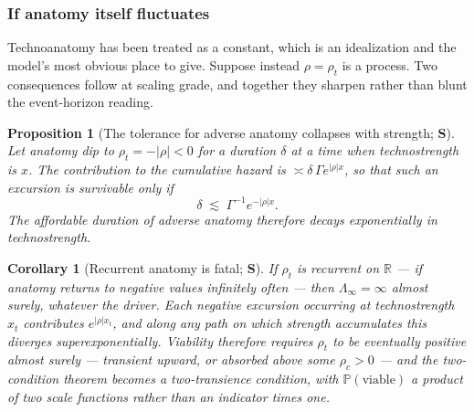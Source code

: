 \documentclass[11pt]{article}
\numberwithin{equation}{section}
\theoremstyle{plain}
\newtheorem{proposition}[theorem]{Proposition}
\newtheorem{corollary}[theorem]{Corollary}
\theoremstyle{definition}
\theoremstyle{remark}
\newcommand{\PP}{\mathbb{P}}
\newcommand{\R}{\mathbb{R}}
\begin{document}
\subsubsection{If anatomy itself fluctuates}\label{gr1:subsub:fluct}

Technoanatomy has been treated as a constant, which is an idealization
and the model's most obvious place to give. Suppose instead
$\rho=\rho_t$ is a process. Two consequences follow at scaling grade,
and together they sharpen rather than blunt the event-horizon reading.

\begin{proposition}[The tolerance for adverse anatomy collapses with
strength; \textbf{S}]\label{gr1:prop:tolerance}
Let anatomy dip to $\rho_t=-|\rho|<0$ for a duration $\delta$ at a time
when technostrength is $x$. The contribution to the cumulative hazard
is $\asymp\delta\,\Gamma e^{|\rho|x}$, so that such an excursion is
survivable only if
\begin{equation}\label{gr1:eq:tolerance}
\delta\;\lesssim\;\Gamma^{-1}e^{-|\rho|x}.
\end{equation}
The affordable duration of adverse anatomy therefore decays
\emph{exponentially in technostrength}.
\end{proposition}

\begin{corollary}[Recurrent anatomy is fatal; \textbf{S}]
\label{gr1:cor:recurrentanatomy}
If $\rho_t$ is recurrent on $\R$ --- if anatomy returns to negative
values infinitely often --- then $\Lambda_\infty=\infty$ almost surely,
\emph{whatever the driver}. Each negative excursion occurring at
technostrength $x_t$ contributes $e^{|\rho|x_t}$, and along any path on
which strength accumulates this diverges superexponentially. Viability
therefore requires $\rho_t$ to be eventually positive almost surely ---
transient upward, or absorbed above some $\rho_c>0$ --- and the
two-condition theorem becomes a \emph{two-transience} condition, with
$\PP(\text{viable})$ a product of two scale functions rather than an
indicator times one.
\end{corollary}
\end{document}

